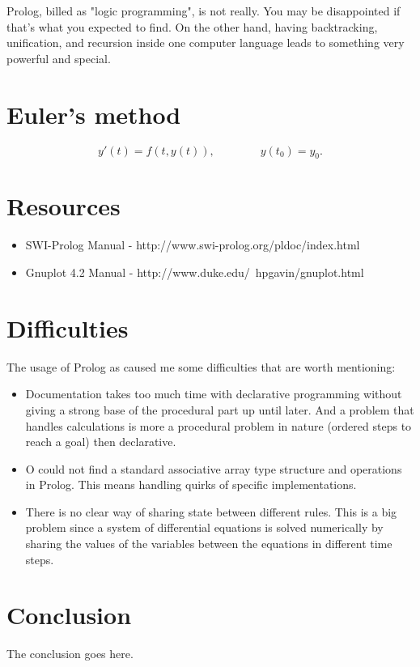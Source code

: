 \documentclass[journal]{IEEEtran}
\begin{document}
Prolog, billed as "logic programming", is not really. You may be disappointed if that's what you expected to find. On the other hand, having backtracking, unification, and recursion inside one computer language leads to something very powerful and special.\cite{merritt1992}


\section{Euler's method}

\begin{equation}
y'(t) = f(t,y(t)), \qquad \qquad y(t_0)=y_0.
\end{equation}

\section{Resources}
\begin{itemize}
\item SWI-Prolog Manual - http://www.swi-prolog.org/pldoc/index.html
\item Gnuplot 4.2 Manual - http://www.duke.edu/~hpgavin/gnuplot.html
\end{itemize}

\section{Difficulties}

The usage of Prolog as caused me some difficulties that are worth mentioning:
\begin{itemize}
\item Documentation takes too much time with declarative programming without giving a strong base of the procedural part up until later. And a problem that handles calculations is more a procedural problem in nature (ordered steps to reach a goal) then declarative.
\item O could not find a standard associative array type structure and operations in Prolog. This means handling quirks of specific implementations.
\item There is no clear way of sharing state between different rules. This is a big problem since a system of differential equations is solved numerically by sharing the values of the variables between the equations in different time steps.
\end{itemize}

\section{Conclusion}
The conclusion goes here.


\ifCLASSOPTIONcaptionsoff
  \newpage
\fi



\end{document}
